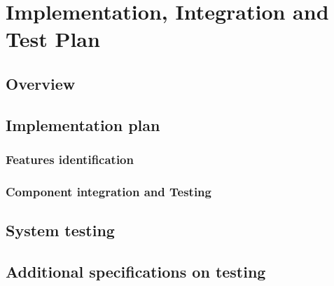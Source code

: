 \chapter{Implementation, Integration and Test Plan}
\section{Overview}
\section{Implementation plan}
\subsection{Features identification}
\subsection{Component integration and Testing}
\section{System testing}
\section{Additional specifications on testing}